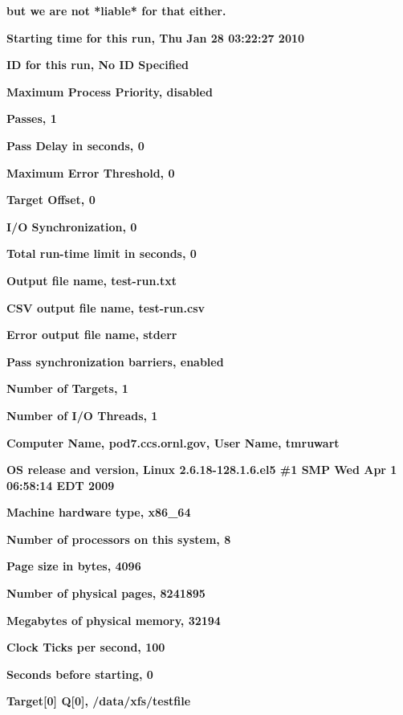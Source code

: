 \textbf{but we are not *liable* for that either.}

\textbf{Starting time for this run, Thu Jan 28 03:22:27 2010}

\textbf{ID for this run, \textquotesingle No ID Specified\textquotesingle{}}

\textbf{Maximum Process Priority, disabled}

\textbf{Passes, 1}

\textbf{Pass Delay in seconds, 0}

\textbf{Maximum Error Threshold, 0}

\textbf{Target Offset, 0}

\textbf{I/O Synchronization, 0}

\textbf{Total run-time limit in seconds, 0}

\textbf{Output file name, test-run.txt}

\textbf{CSV output file name, test-run.csv}

\textbf{Error output file name, stderr}

\textbf{Pass synchronization barriers, enabled}

\textbf{Number of Targets, 1}

\textbf{Number of I/O Threads, 1}

\textbf{Computer Name, pod7.ccs.ornl.gov, User Name, tmruwart}

\textbf{OS release and version, Linux 2.6.18-128.1.6.el5 \#1 SMP Wed Apr 1 06:58:14 EDT 2009}

\textbf{Machine hardware type, x86\_64}

\textbf{Number of processors on this system, 8}

\textbf{Page size in bytes, 4096}

\textbf{Number of physical pages, 8241895}

\textbf{Megabytes of physical memory, 32194}

\textbf{Clock Ticks per second, 100}

\textbf{Seconds before starting, 0}

\textbf{\hfill\break
}

\textbf{Target{[}0{]} Q{[}0{]}, /data/xfs/testfile}


